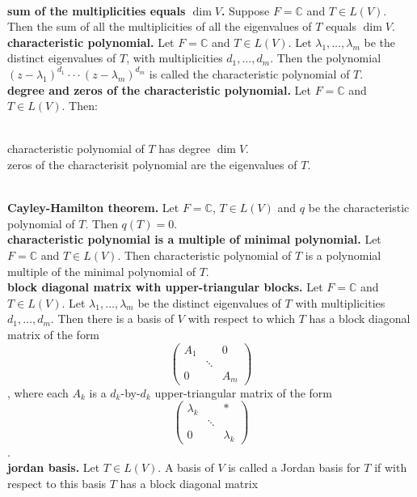 	\\ \textbf{sum of the multiplicities equals $\dim V$. } Suppose $F=\mathbb{C}$ and $T \in L(V)$. Then the sum of all the multiplicities of all the eigenvalues of $T$ equals $\dim V$. 
	\\ \textbf{characteristic polynomial. } Let $F = \mathbb{C}$ and $T \in L(V)$. Let $\lambda_1,\dots,\lambda_m$ be the distinct eigenvalues of $T$, with multiplicities $d_1,\dots,d_m$. Then the polynomial $(z - \lambda_1)^{d_1} \cdot \cdot \cdot (z - \lambda_m)^{d_m}$ is called the characteristic polynomial of $T$. 
	\\ \textbf{degree and zeros of the characteristic polynomial. } Let $F = \mathbb{C}$ and $T \in L(V)$. Then: 
	\begin{enumerate}
		\\ characteristic polynomial of $T$ has degree $\dim V$. 
		\\ zeros of the characterisit polynomial are the eigenvalues of $T$. 
	\end{enumerate}
	\\ \textbf{Cayley-Hamilton theorem. } Let $F = \mathbb{C}$, $T \in L(V)$ and $q$ be the characteristic polynomial of $T$. Then $q(T) = 0$. 
	\\ \textbf{characteristic polynomial is a multiple of minimal polynomial. } Let $F = \mathbb{C}$ and $T \in L(V)$. Then characteristic polynomial of $T$ is a polynomial multiple of the minimal polynomial of $T$. 
	\\ \textbf{block diagonal matrix with upper-triangular blocks. } Let $F = \mathbb{C}$ and $T \in L(V)$. Let $\lambda_1,\dots,\lambda_m$ be the distinct eigenvalues of $T$ with multiplicities $d_1,\dots,d_m$. Then there is a basis of $V$ with respect to which $T$ has a block diagonal matrix of the form 
	$$
	\begin{pmatrix}
	A_1 & & 0 \\
	 & \ddots &  \\
	0 & & A_m
	\end{pmatrix}
	$$, where each $A_k$ is a $d_k$-by-$d_k$ upper-triangular matrix of the form 
	$$
	\begin{pmatrix}
	\lambda_k & & * \\
	 & \ddots &  \\
	0 & & \lambda_k
	\end{pmatrix}
	$$. 
	\\ \textbf{jordan basis. } Let $T \in L(V)$. A basis of $V$ is called a Jordan basis for $T$ if with respect to this basis $T$ has a block diagonal matrix 
